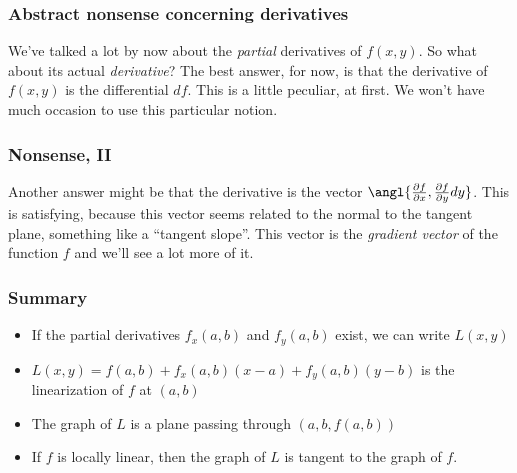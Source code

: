 \documentclass[11pt,ignorenonframetext,]{beamer}
\begin{document}
\begin{frame}\frametitle{Abstract nonsense concerning derivatives}

We've talked a lot by now about the \emph{partial} derivatives of
$f(x,y)$. So what about its actual \emph{derivative}? The best answer,
for now, is that the derivative of $f(x,y)$ is the differential $df$.
This is a little peculiar, at first. We won't have much occasion to use
this particular notion.

\end{frame}

\begin{frame}\frametitle{Nonsense, II}

Another answer might be that the derivative is the vector
$\angl{\frac{\partial f}{\partial x},\frac{\partial f}{\partial y} dy}$.
This is satisfying, because this vector seems related to the normal to
the tangent plane, something like a ``tangent slope''. This vector is
the \emph{gradient vector} of the function $f$ and we'll see a lot more
of it.

\end{frame}

\begin{frame}\frametitle{Summary}

\begin{itemize}[<+->]
\itemsep1pt\parskip0pt
\item
  If the partial derivatives $f_x(a,b)$ and $f_y(a,b)$ exist, we can
  write $L(x,y)$
\item
  $L(x,y) = f(a,b) + f_x(a,b)(x-a) + f_y(a,b)(y-b)$ is the linearization
  of $f$ at $(a,b)$
\item
  The graph of $L$ is a plane passing through $(a,b,f(a,b))$
\item
  If $f$ is locally linear, then the graph of $L$ is tangent to the
  graph of $f$.
\end{itemize}

\end{frame}
\end{document}
